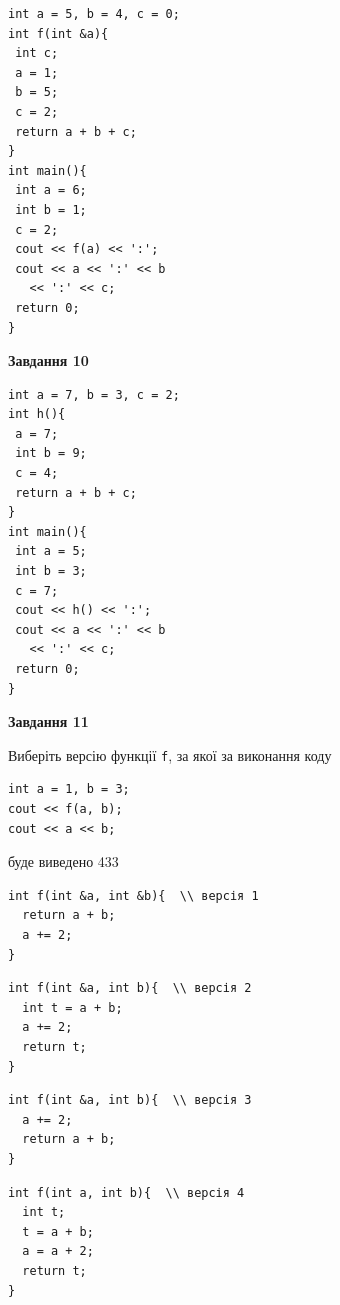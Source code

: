 \documentclass[12pt, ukrainian]{article}
\def\code#1{\Verb!#1!}
\begin{document}
{\begin {large}
\begin{minipage}[t]{7.0cm}
\begin{verbatim}
int a = 5, b = 4, c = 0;
int f(int &a){
 int c;
 a = 1;
 b = 5;
 c = 2;
 return a + b + c;
}
int main(){
 int a = 6;
 int b = 1;
 c = 2;
 cout << f(a) << ':';
 cout << a << ':' << b 
   << ':' << c;
 return 0;
}
\end{verbatim}



\begin{center}
\textbf{Завдання 10}
\end{center}
\vspace{-8mm}

\begin{verbatim}
int a = 7, b = 3, c = 2;
int h(){
 a = 7;
 int b = 9;
 c = 4;
 return a + b + c;
}
int main(){
 int a = 5;
 int b = 3;
 c = 7;
 cout << h() << ':';
 cout << a << ':' << b 
   << ':' << c;
 return 0;
}
\end{verbatim}

\end{minipage}
\vline \hspace{1mm}
\begin{minipage}[t]{11.0cm}

\begin{center}
\textbf{Завдання 11}
\end{center}
Виберіть версію функції \code{f}, за якої за виконання коду
\begin{verbatim}
int a = 1, b = 3;
cout << f(a, b);
cout << a << b;
\end{verbatim}

буде виведено 433

\begin{verbatim}
int f(int &a, int &b){  \\ версія 1
  return a + b;
  a += 2;
}
\end{verbatim}

\vspace{-8mm}\begin{verbatim}
int f(int &a, int b){  \\ версія 2
  int t = a + b;
  a += 2;
  return t;
}
\end{verbatim}

\vspace{-8mm}\begin{verbatim}
int f(int &a, int b){  \\ версія 3
  a += 2;
  return a + b;
}
\end{verbatim}

\vspace{-8mm}\begin{verbatim}
int f(int a, int b){  \\ версія 4
  int t;
  t = a + b;
  a = a + 2;
  return t;
}
\end{verbatim}




\end{minipage}
\end{large}}
\end{document}
